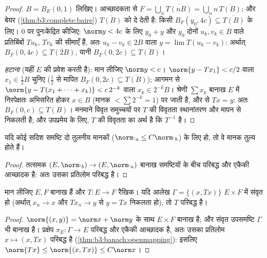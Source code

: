 \begin{proof}
$B = B_E(0,1)$ लिखिए। आच्छादकता से $F = \bigcup_n
\overline{T(nB)} = \bigcup_n n\,\overline{T(B)}$; और बेयर (\cref{thm:b3:complete:baire}) $\overline{T(B)}$ को
 दे देती है: किसी $B_F(y_0, 4c) \subseteq
\overline{T(B)}$ के लिए। $0$ पर पुनःकेंद्रित
कीजिए: $\norm y < 4c$ के लिए $y_0 + y$ और $y_0$ दोनों $u_k, v_k \in B$ वाले प्रतिबिंबों
$Tu_k$, $Tv_k$ की सीमाएँ हैं, अतः $u_k - v_k
\in 2B$ वाला $y = \lim T(u_k - v_k)$: अर्थात् $B_F(0, 4c) \subseteq \overline{T(2B)}$,
यानी $B_F(0, 2c) \subseteq \overline{T(B)}$।

\emph{ हटाना} (यहीं $E$ की  प्रवेश करती है): मान
लीजिए $\norm y < c$। $\norm{y -
Tx_1} < c/2$ वाला $x_1 \in \frac12 B$ चुनिए ($\frac12$ से मापित $B_F(0,2c) \subseteq \overline{T(B)}$);
आगमन से $\norm{y -
T(x_1 + \dots + x_k)} < c\,2^{-k}$ वाला $x_k \in 2^{-k}B$। श्रेणी $\sum x_k$ बानाख $E$ में निरपेक्षतः
अभिसरित होकर $x \in B$ (मानक $<
\sum 2^{-k} = 1$) पर जाती है, और  से $Tx = y$:
अतः $B_F(0, c)
\subseteq T(B)$। मनमाने विवृत समुच्चयों पर $T$ की विवृतता स्थानांतरण
और मापन से निकलती है; और उपप्रमेय के लिए, $T$ की विवृतता का अर्थ
है कि $T^{-1}$  है।
\end{proof}

\begin{corollary}[तुल्य मानक]\label{cor:b3:banach:equivnorms}
यदि कोई सदिश समष्टि दो तुलनीय मानकों ($\norm\cdot_a \leq C\norm\cdot_b$) के लिए  हो, तो
वे मानक तुल्य होते हैं।
\end{corollary}

\begin{proof}
तत्समक $(E, \norm\cdot_b) \to (E, \norm\cdot_a)$ बानाख समष्टियों के बीच परिबद्ध और एकैकी आच्छादक है:
अतः उसका प्रतिलोम परिबद्ध है।
\end{proof}

\begin{theorem}[संवृत आलेख]\label{thm:b3:banach:closedgraph}
मान लीजिए $E, F$ बानाख हैं और $T \colon E \to F$ रैखिक। यदि आलेख $\Gamma = \{(x, Tx)\}$ $E \times F$
में संवृत हो (अर्थात् $x_n \to x$ और $Tx_n \to y$ से $y = Tx$ निकलता हो), तो
$T$ परिबद्ध है।
\end{theorem}

\begin{proof}
$\norm{(x,y)} = \norm x + \norm y$ के साथ $E \times F$ बानाख है; और संवृत उपसमष्टि $\Gamma$ भी बानाख है।
प्रक्षेप $\pi_E\colon \Gamma \to E$ परिबद्ध और एकैकी आच्छादक है, अतः उसका प्रतिलोम
$x \mapsto (x, Tx)$ परिबद्ध है (\cref{thm:b3:banach:openmapping}): इसलिए $\norm{Tx} \leq \norm{(x,
Tx)} \leq C\norm x$।
\end{proof}


